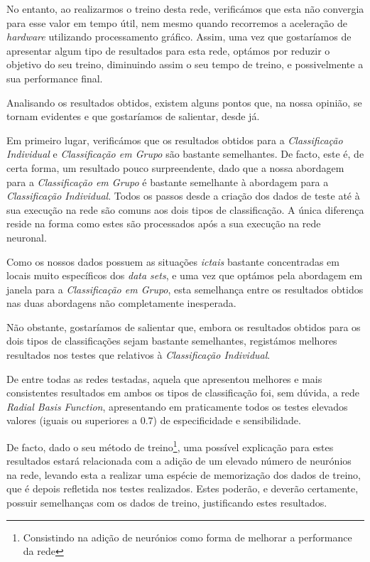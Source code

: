 \documentclass{article}
\begin{document}
No entanto, ao realizarmos o treino desta rede, verificámos que esta não convergia para esse valor em tempo útil, nem mesmo quando recorremos a aceleração de \emph{hardware} utilizando processamento gráfico. Assim, uma vez que gostaríamos de apresentar algum tipo de resultados para esta rede, optámos por reduzir o objetivo do seu treino, diminuindo assim o seu tempo de treino, e possivelmente a sua performance final.

Analisando os resultados obtidos, existem alguns pontos que, na nossa opinião, se tornam evidentes e que gostaríamos de salientar, desde já.

Em primeiro lugar, verificámos que os resultados obtidos para a \emph{Classificação Individual} e \emph{Classificação em Grupo} são bastante semelhantes. De facto, este é, de certa forma, um resultado pouco surpreendente, dado que a nossa abordagem para a \emph{Classificação em Grupo} é bastante semelhante à abordagem para a \emph{Classificação Individual}. Todos os passos desde a criação dos dados de teste até à sua execução na rede são comuns aos dois tipos de classificação. A única diferença reside na forma como estes são processados após a sua execução na rede neuronal.

Como os nossos dados possuem as situações \emph{ictais} bastante concentradas em locais muito específicos dos \emph{data sets}, e uma vez que optámos pela abordagem em janela para a \emph{Classificação em Grupo}, esta semelhança entre os resultados obtidos nas duas abordagens não completamente inesperada.

Não obstante, gostaríamos de salientar que, embora os resultados obtidos para os dois tipos de classificações sejam bastante semelhantes, registámos melhores resultados nos testes que relativos à \emph{Classificação Individual}.

De entre todas as redes testadas, aquela que apresentou melhores e mais consistentes resultados em ambos os tipos de classificação foi, sem dúvida, a rede \emph{Radial Basis Function}, apresentando em praticamente todos os testes elevados valores (iguais ou superiores a $0.7$) de especificidade e sensibilidade.

De facto, dado o seu método de treino\footnote{Consistindo na adição de neurónios como forma de melhorar a performance da rede}, uma possível explicação para estes resultados estará relacionada com a adição de um elevado número de neurónios na rede, levando esta a realizar uma espécie de memorização dos dados de treino, que é depois refletida nos testes realizados. Estes poderão, e deverão certamente, possuir semelhanças com os dados de treino, justificando estes resultados.
\end{document}
